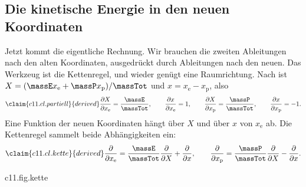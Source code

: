 \subsection{Die kinetische Energie in den neuen Koordinaten}\label{c11.s2.2}

Jetzt kommt die eigentliche Rechnung. Wir brauchen die zweiten Ableitungen nach den
alten Koordinaten, ausgedrückt durch Ableitungen nach den neuen. Das Werkzeug ist die
Kettenregel, und wieder genügt eine Raumrichtung. Nach  ist
$X = (\massE x_{\mathrm{e}} + \massP x_{\mathrm{p}})/\massTot$ und
$x = x_{\mathrm{e}} - x_{\mathrm{p}}$, also
\begin{equation}\label{c11.eq.partiell}\claim{c11.cl.partiell}{derived}
  \frac{\partial X}{\partial x_{\mathrm{e}}} = \frac{\massE}{\massTot},
  \qquad
  \frac{\partial x}{\partial x_{\mathrm{e}}} = 1,
  \qquad
  \frac{\partial X}{\partial x_{\mathrm{p}}} = \frac{\massP}{\massTot},
  \qquad
  \frac{\partial x}{\partial x_{\mathrm{p}}} = -1.
\end{equation}
Eine Funktion der neuen Koordinaten hängt über $X$ und über $x$ von $x_{\mathrm{e}}$ ab.
Die Kettenregel sammelt beide Abhängigkeiten ein:
\begin{equation}\label{c11.eq.kette}\claim{c11.cl.kette}{derived}
  \frac{\partial}{\partial x_{\mathrm{e}}}
  = \frac{\massE}{\massTot}\frac{\partial}{\partial X} + \frac{\partial}{\partial x},
  \qquad
  \frac{\partial}{\partial x_{\mathrm{p}}}
  = \frac{\massP}{\massTot}\frac{\partial}{\partial X} - \frac{\partial}{\partial x}.
\end{equation}

\begin{tpcfigure}{c11.fig.kette}
  \caption{Die Kettenregel \eqref{c11.eq.kette} als Schema. Eine Funktion von $X$ und $x$ hängt auf zwei Wegen von $x_{\mathrm{e}}$ ab (durchgezogen) und auf zwei Wegen von $x_{\mathrm{p}}$ (gestrichelt). An jedem Pfeil steht der Faktor aus \eqref{c11.eq.partiell}; die Ableitung nach einer alten Koordinate ist die Summe über ihre beiden Wege.}
\end{tpcfigure}

